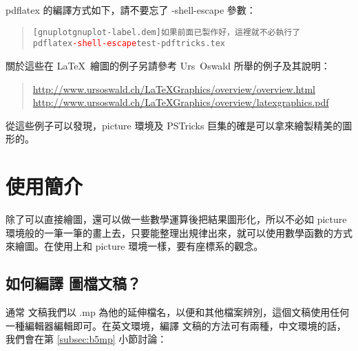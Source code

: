 {\ttfamily pdflatex} 的編譯方式如下，請不要忘了 {\ttfamily -shell-escape} 參數：

\begin{quote}
  \begin{alltt}
    [gnuplot gnuplot-label.dem]  如果前面已製作好，這裡就不必執行了
    pdflatex \textcolor{red}{-shell-escape} test-pdftricks.tex
  \end{alltt}
\end{quote}

關於這些在 \LaTeX\ 繪圖的例子另請參考 Urs~Oswald 所舉的例子及其說明：

\begin{quote}
  \url{http://www.ursoswald.ch/LaTeXGraphics/overview/overview.html}\\
  \url{http://www.ursoswald.ch/LaTeXGraphics/overview/latexgraphics.pdf}
\end{quote}

從這些例子可以發現，{\ttfamily picture} 環境及 {\sffamily PSTricks} 巨集的確是可以拿來繪製精美的圖形的。


\section{\MP{} 使用簡介}
\label{sec:metapost}

\MP{} 除了可以直接繪圖，還可以做一些數學運算後把結果圖形化，所以不必如 {\ttfamily picture} 環境般的一筆一筆的畫上去，只要能整理出規律出來，就可以使用數學函數的方式來繪圖。在使用上和 {\ttfamily picture} 環境一樣，要有座標系的觀念。

\subsection{如何編譯 \MP{} 圖檔文稿？}

通常 \MP{} 文稿我們以 {\ttfamily .mp} 為他的延伸檔名，以便和其他檔案辨別，這個文稿使用任何一種編輯器編輯即可。在英文環境，編譯 \MP{} 文稿的方法可有兩種，中文環境的話，我們會在第 \ref{subsec:b5mp} 小節討論：

